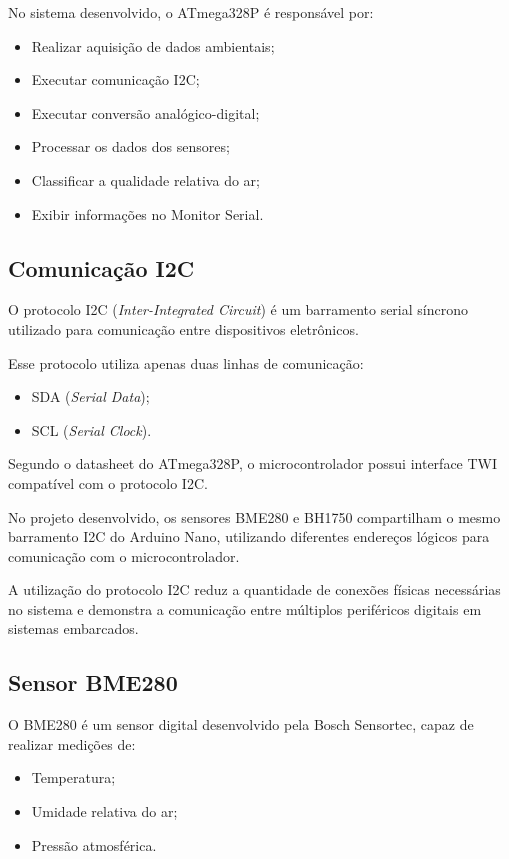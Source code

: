 \documentclass[a4paper,12pt]{article}
\begin{document}
No sistema desenvolvido, o ATmega328P é responsável por:
\begin{itemize}
    \item Realizar aquisição de dados ambientais;
    \item Executar comunicação I2C;
    \item Executar conversão analógico-digital;
    \item Processar os dados dos sensores;
    \item Classificar a qualidade relativa do ar;
    \item Exibir informações no Monitor Serial.
\end{itemize}

\subsection{Comunicação I2C}

O protocolo I2C (\textit{Inter-Integrated Circuit}) é um barramento serial síncrono utilizado para comunicação entre dispositivos eletrônicos.

Esse protocolo utiliza apenas duas linhas de comunicação:
\begin{itemize}
    \item SDA (\textit{Serial Data});
    \item SCL (\textit{Serial Clock}).
\end{itemize}

Segundo o datasheet do ATmega328P, o microcontrolador possui interface TWI compatível com o protocolo I2C.

No projeto desenvolvido, os sensores BME280 e BH1750 compartilham o mesmo barramento I2C do Arduino Nano, utilizando diferentes endereços lógicos para comunicação com o microcontrolador.

A utilização do protocolo I2C reduz a quantidade de conexões físicas necessárias no sistema e demonstra a comunicação entre múltiplos periféricos digitais em sistemas embarcados.

\subsection{Sensor BME280}

O BME280 é um sensor digital desenvolvido pela Bosch Sensortec, capaz de realizar medições de:
\begin{itemize}
    \item Temperatura;
    \item Umidade relativa do ar;
    \item Pressão atmosférica.
\end{itemize}
\end{document}
